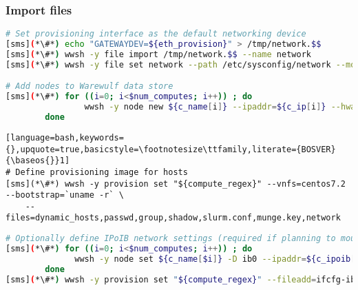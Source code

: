 \documentclass[letterpaper]{article}
\newcommand{\baseos}{centos7.2}
\begin{document}
\subsubsection{Import files} \label{sec:file_import}







\begin{lstlisting}[language=bash,keywords={},upquote=true,basicstyle=\footnotesize\ttfamily,]
# Set provisioning interface as the default networking device
[sms](*\#*) echo "GATEWAYDEV=${eth_provision}" > /tmp/network.$$
[sms](*\#*) wwsh -y file import /tmp/network.$$ --name network
[sms](*\#*) wwsh -y file set network --path /etc/sysconfig/network --mode=0644 --uid=0

# Add nodes to Warewulf data store
[sms](*\#*) for ((i=0; i<$num_computes; i++)) ; do
                wwsh -y node new ${c_name[i]} --ipaddr=${c_ip[i]} --hwaddr=${c_mac[i]} -D ${eth_provision}
        done
\end{lstlisting}

\begin{lstlisting}[language=bash,keywords={},upquote=true,basicstyle=\footnotesize\ttfamily,literate={BOSVER}{\baseos{}}1]
# Define provisioning image for hosts
[sms](*\#*) wwsh -y provision set "${compute_regex}" --vnfs=centos7.2 --bootstrap=`uname -r` \
    --files=dynamic_hosts,passwd,group,shadow,slurm.conf,munge.key,network 
\end{lstlisting}



\begin{lstlisting}[language=bash,keywords={},upquote=true,basicstyle=\footnotesize\ttfamily]
# Optionally define IPoIB network settings (required if planning to mount Lustre over IB)
[sms](*\#*) for ((i=0; i<$num_computes; i++)) ; do
              wwsh -y node set ${c_name[$i]} -D ib0 --ipaddr=${c_ipoib[$i]} --netmask=${ipoib_netmask}
        done
[sms](*\#*) wwsh -y provision set "${compute_regex}" --fileadd=ifcfg-ib0.ww
\end{lstlisting}
\end{document}
